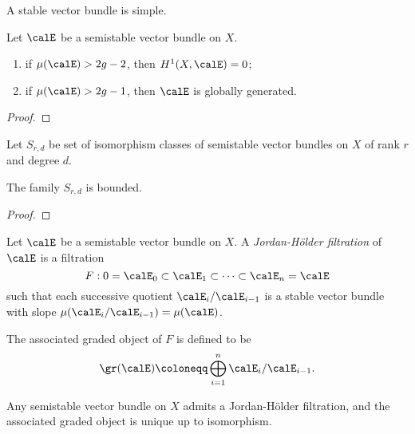     \begin{corollary}\label{cor:stable_vector_bundles_are_simple}
        A stable vector bundle is simple.
    \end{corollary}

    \begin{lemma}\label{lem:vanishing_and_global_generation_of_semistable_vector_bundles}
        Let \(\calE\) be a semistable vector bundle on \(X\).
        \begin{enumerate}
            \item if \(\mu(\calE) > 2g-2\), then \(H^1(X,\calE) = 0\);
            \item if \(\mu(\calE) > 2g-1\), then \(\calE\) is globally generated.
        \end{enumerate}
    \end{lemma}
    \begin{proof}
    \end{proof}

    Let \(S_{r,d}\) be set of isomorphism classes of semistable vector bundles on \(X\) of rank \(r\) and degree \(d\).

    \begin{proposition}\label{prop:semistable_vector_bundles_are_bounded}
        The family \(S_{r,d}\) is bounded.
    \end{proposition}
    \begin{proof}
    \end{proof}


    \begin{definition}\label{def:Jordan-Holder_filtration}
        Let \(\calE\) be a semistable vector bundle on \(X\).
        A \emph{Jordan-H\"older filtration} of \(\calE\) is a filtration 
        \[ F : 0 = \calE_0 \subset \calE_1 \subset \cdots \subset \calE_n = \calE \]
        such that each successive quotient \(\calE_i/\calE_{i-1}\) is a stable vector bundle with slope \(\mu(\calE_i/\calE_{i-1}) = \mu(\calE)\).
        
        The associated graded object of \(F\) is defined to be 
        \[ \gr(\calE) \coloneqq \bigoplus_{i=1}^n \calE_i/\calE_{i-1}. \]
        
        Any semistable vector bundle on \(X\) admits a Jordan-H\"older filtration, and the associated graded object is unique up to isomorphism.
    \end{definition}

